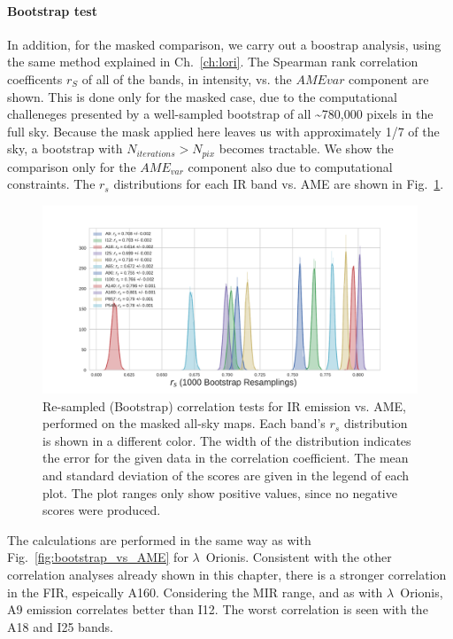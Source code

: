           \paragraph{Bootstrap test}
              In addition, for the masked comparison, we carry out a boostrap analysis, using the same method explained in Ch.~\ref{ch:lori}. The Spearman rank correlation coefficents $r_{S}$ of all of the bands, in intensity, vs. the $AME{var}$ component are shown. This is done only for the masked case, due to the computational challeneges presented by a well-sampled bootstrap of all \textasciitilde{}780,000 pixels in the full sky. Because the mask applied here leaves us with approximately 1/7 of the sky, a bootstrap with $N_{iterations} > N_{pix}$ becomes tractable. We show the comparison only for the $AME_{var}$ component also due to computational constraints. The $r_{s}$ distributions for each IR band vs. AME are shown in Fig.~\ref{fig:bootstrap_vs_AME_allsky_masked}.
                \begin{figure}
                     \includegraphics[width=\textwidth,trim={3cm 0.25cm 2.5cm 1cm},clip]{../Plots/ch_allsky/bootstrap_vs_AME_spearman_maskall_i1000.pdf}
                     \centering
                     \caption{Re-sampled (Bootstrap) correlation tests for IR emission vs. AME, performed on the masked all-sky maps. Each band's $r_{s}$ distribution is shown in a different color. The width of the distribution indicates the error for the given data in the correlation coefficient. The mean and standard deviation of the scores are given in the legend of each plot. The plot ranges only show positive values, since no negative scores were produced. }
                     \label{fig:bootstrap_vs_AME_allsky_masked}
                \end{figure}
            The calculations are performed in the same way as with Fig.~\ref{fig:bootstrap_vs_AME} for $\lambda$~Orionis. Consistent with the other correlation analyses already shown in this chapter, there is a stronger correlation in the FIR, espeically A160. Considering the MIR range, and as with $\lambda$~Orionis, A9 emission correlates better than I12. The worst correlation is seen with the A18 and I25 bands.
